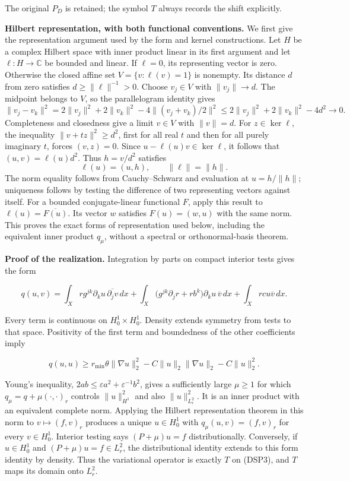 \documentclass[
  11pt,
]{article}
\begin{document}
The original \(P_D\) is retained; the symbol \(T\) always records the
shift explicitly.

\textbf{Hilbert representation, with both functional conventions.} We
first give the representation argument used by the form and kernel
constructions. Let \(H\) be a complex Hilbert space with inner product
linear in its first argument and let \(\ell:H\to\mathbb C\) be bounded
and linear. If \(\ell=0\), its representing vector is zero. Otherwise
the closed affine set \(V=\{v:\ell(v)=1\}\) is nonempty. Its distance
\(d\) from zero satisfies \(d\geq\|\ell\|^{-1}>0\). Choose \(v_j\in V\)
with \(\|v_j\|\to d\). The midpoint belongs to \(V\), so the
parallelogram identity gives \[
 \|v_j-v_k\|^2
 =2\|v_j\|^2+2\|v_k\|^2-4\|(v_j+v_k)/2\|^2
 \leq2\|v_j\|^2+2\|v_k\|^2-4d^2\longrightarrow0.
\] Completeness and closedness give a limit \(v\in V\) with \(\|v\|=d\).
For \(z\in\ker\ell\), the inequality \(\|v+t z\|^2\geq d^2\), first for
all real \(t\) and then for all purely imaginary \(t\), forces
\((v,z)=0\). Since \(u-\ell(u)v\in\ker\ell\), it follows that
\((u,v)=\ell(u)d^2\). Thus \(h=v/d^2\) satisfies \[
 \ell(u)=(u,h),\qquad\|\ell\|=\|h\|.
\] The norm equality follows from Cauchy--Schwarz and evaluation at
\(u=h/\|h\|\); uniqueness follows by testing the difference of two
representing vectors against itself. For a bounded conjugate-linear
functional \(F\), apply this result to \(\ell(u)=\overline{F(u)}\). Its
vector \(w\) satisfies \(F(u)=(w,u)\) with the same norm. This proves
the exact forms of representation used below, including the equivalent
inner product \(q_\mu\), without a spectral or orthonormal-basis
theorem.

\textbf{Proof of the realization.} Integration by parts on compact
interior tests gives the form

\[
 q(u,v)=\int_X rg^{jk}\partial_k u\,\overline{\partial_jv}\,dx
 +\int_X\bigl(g^{jk}\partial_jr+rb^k\bigr)\partial_ku\,\overline v\,dx
 +\int_Xrcu\overline v\,dx.
 \tag{DSP5}
\]

Every term is continuous on \(H_0^1\times H_0^1\). Density extends
symmetry from tests to that space. Positivity of the first term and
boundedness of the other coefficients imply

\[
 q(u,u)\geq r_{\min}\theta\|\nabla u\|_2^2
 -C\|u\|_2\|\nabla u\|_2-C\|u\|_2^2.
\]

Young's inequality, \(2ab\leq\varepsilon a^2+\varepsilon^{-1}b^2\),
gives a sufficiently large \(\mu\geq1\) for which
\(q_\mu=q+\mu(\cdot,\cdot)_r\) controls \(\|u\|_{H^1}^2\) and also
\(\|u\|_{L^2_r}^2\). It is an inner product with an equivalent complete
norm. Applying the Hilbert representation theorem in this norm to
\(v\mapsto(f,v)_r\) produces a unique \(u\in H_0^1\) with
\(q_\mu(u,v)=(f,v)_r\) for every \(v\in H_0^1\). Interior testing says
\((P+\mu)u=f\) distributionally. Conversely, if \(u\in H_0^1\) and
\((P+\mu)u=f\in L^2_r\), the distributional identity extends to this
form identity by density. Thus the variational operator is exactly \(T\)
on (DSP3), and \(T\) maps its domain onto \(L^2_r\).
\end{document}
